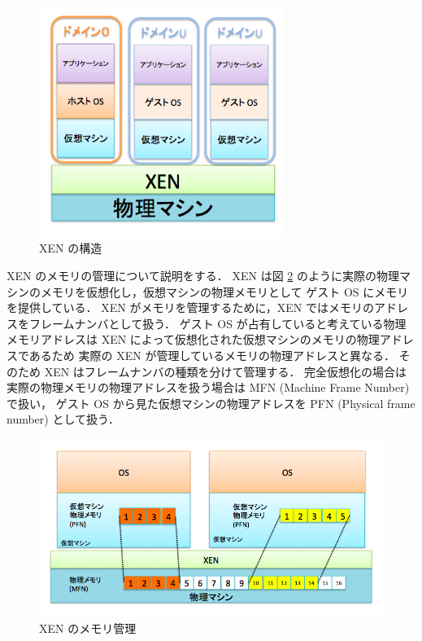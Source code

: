 \documentclass[graduation-thesis]{mlarticle}
\begin{document}
\begin{figure}[H]\begin{center}\includegraphics[width=8.0cm]{./img/xen_structure.png}\caption{ XEN の構造}\label{xen_structure}\end{center}\end{figure}

XEN のメモリの管理について説明をする．
XEN は図 \ref{fn} のように実際の物理マシンのメモリを仮想化し，仮想マシンの物理メモリとして
ゲスト OS にメモリを提供している．
XEN がメモリを管理するために，XEN ではメモリのアドレスをフレームナンバとして扱う．
ゲスト OS が占有していると考えている物理メモリアドレスは
XEN によって仮想化された仮想マシンのメモリの物理アドレスであるため
実際の XEN が管理しているメモリの物理アドレスと異なる．
そのため XEN はフレームナンバの種類を分けて管理する．
完全仮想化の場合は
実際の物理メモリの物理アドレスを扱う場合は MFN (Machine Frame Number)で扱い，
ゲスト OS から見た仮想マシンの物理アドレスを PFN (Physical frame number) として扱う．

\begin{figure}[H]\begin{center}\includegraphics[width=12.0cm]{./img/fn.png}\caption{ XEN のメモリ管理}\label{fn}\end{center}\end{figure}
\end{document}
